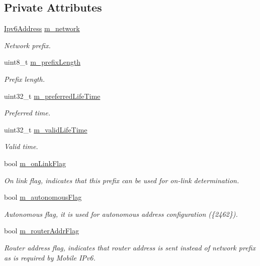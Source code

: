 \subsection*{Private Attributes}
\begin{DoxyCompactItemize}
\item 
\hyperlink{classns3_1_1Ipv6Address}{Ipv6\+Address} \hyperlink{classns3_1_1RadvdPrefix_a84fa239cc120bf52f476416a010a40f5}{m\+\_\+network}
\begin{DoxyCompactList}\small\item\em Network prefix. \end{DoxyCompactList}\item 
uint8\+\_\+t \hyperlink{classns3_1_1RadvdPrefix_a664e8acbea39d87b88273062d060540c}{m\+\_\+prefix\+Length}
\begin{DoxyCompactList}\small\item\em Prefix length. \end{DoxyCompactList}\item 
uint32\+\_\+t \hyperlink{classns3_1_1RadvdPrefix_a4206d6b7beb2febcbb7783bc9cc6eacd}{m\+\_\+preferred\+Life\+Time}
\begin{DoxyCompactList}\small\item\em Preferred time. \end{DoxyCompactList}\item 
uint32\+\_\+t \hyperlink{classns3_1_1RadvdPrefix_a9a6f2b50e4f17ad992eee2fdf1540e98}{m\+\_\+valid\+Life\+Time}
\begin{DoxyCompactList}\small\item\em Valid time. \end{DoxyCompactList}\item 
bool \hyperlink{classns3_1_1RadvdPrefix_a68f492279ddcc42a8b598fd856f834e8}{m\+\_\+on\+Link\+Flag}
\begin{DoxyCompactList}\small\item\em On link flag, indicates that this prefix can be used for on-\/link determination. \end{DoxyCompactList}\item 
bool \hyperlink{classns3_1_1RadvdPrefix_a74c95a5d31652c6fc997b7fd4079eedc}{m\+\_\+autonomous\+Flag}
\begin{DoxyCompactList}\small\item\em Autonomous flag, it is used for autonomous address configuration (\{2462\}). \end{DoxyCompactList}\item 
bool \hyperlink{classns3_1_1RadvdPrefix_a14fddd31f06239439a29e6efa1b80d8a}{m\+\_\+router\+Addr\+Flag}
\begin{DoxyCompactList}\small\item\em Router address flag, indicates that router address is sent instead of network prefix as is required by Mobile I\+Pv6. \end{DoxyCompactList}\end{DoxyCompactItemize}
